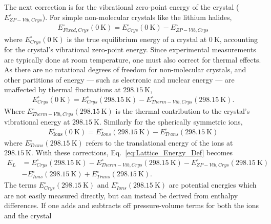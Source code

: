 \documentclass[preprint,aps,prb,floatfix]{revtex4-1}
\begin{document}
The next correction is for the vibrational zero-point energy of the crystal ($E^{\circ}_{ZP-Vib,Crys}$). For simple non-molecular crystals like the lithium halides,
\begin{align}
E_{Fixed,Crys}^{\circ} (\SI{0}{\kelvin}) = E_{Crys}^{\circ} (\SI{0}{\kelvin}) - E^{\circ}_{ZP-Vib,Crys}
\end{align}
where $E^{\circ}_{Crys} (\SI{0}{\kelvin})$ is the true equilibrium energy of a crystal at $\SI{0}{\kelvin}$, accounting for the crystal's vibrational zero-point energy. Since experimental measurements are typically done at room temperature, one must also correct for thermal effects. As there are no rotational degrees of freedom for non-molecular crystals, and other partitions of energy --- such as electronic and nuclear energy --- are unaffected by thermal fluctuations at $\SI{298.15}{\kelvin}$,
\begin{align}
E^{\circ}_{Crys} (\SI{0}{\kelvin}) = E^{\circ}_{Crys} (\SI{298.15}{\kelvin}) - E^{\circ}_{Therm-Vib,Crys} (\SI{298.15}{\kelvin}).
\end{align}
Where $E^{\circ}_{Therm-Vib,Crys} (\SI{298.15}{\kelvin})$ is the thermal contribution to the crystal's vibrational energy at $\SI{298.15}{\kelvin}$. Similarly for the spherically symmetric ions,
\begin{align}
E^{\circ}_{\text{Ions}}(\SI{0}{\kelvin}) = E^{\circ}_{Ions}(\SI{298.15}{\kelvin}) - E^{\circ}_{Trans} (\SI{298.15}{\kelvin})
\end{align}
where $E^{\circ}_{Trans} (\SI{298.15}{\kelvin})$ refers to the translational energy of the ions at $\SI{298.15}{\kelvin}$. With these corrections, Eq.~\ref{eq:Lattice_Energy_Def} becomes
\begin{equation}
\begin{split}
\label{eq:Lattice_Energy2}
E_{L} &= E^{\circ}_{Crys} (\SI{298.15}{\kelvin}) - E^{\circ}_{Therm-Vib,Crys} (\SI{298.15}{\kelvin}) - E^{\circ}_{ZP-Vib,Crys} (\SI{298.15}{\kelvin})\\ &- E^{\circ}_{Ions}(\SI{298.15}{\kelvin}) + E^{\circ}_{Trans}(\SI{298.15}{\kelvin}).
\end{split}
\end{equation}
The terms $E^{\circ}_{Crys} (\SI{298.15}{\kelvin})$ and $E^{\circ}_{Ions}(\SI{298.15}{\kelvin})$ are potential energies which are not easily measured directly, but can instead be derived from enthalpy differences. If one adds and subtracts off pressure-volume terms for both the ions and the crystal
\end{document}
